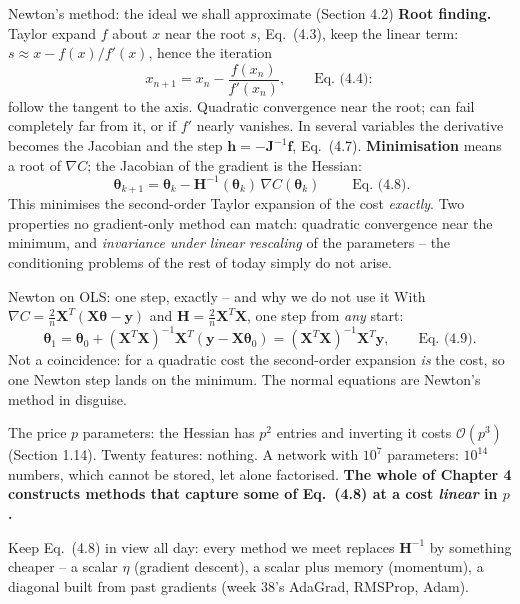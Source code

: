 \documentclass[10pt,aspectratio=169]{beamer}
\begin{document}
\begin{frame}{Newton's method: the ideal we shall approximate (Section 4.2)}
\textbf{Root finding.}  Taylor expand $f$ about $x$ near the root $s$,
Eq.~(4.3), keep the linear term:
$s\approx x-f(x)/f'(x)$, hence the iteration
\[
  x_{n+1}=x_n-\frac{f(x_n)}{f'(x_n)},\qquad\text{Eq.~(4.4)}:
\]
follow the tangent to the axis.  Quadratic convergence near the root; can
fail completely far from it, or if $f'$ nearly vanishes.  In several
variables the derivative becomes the Jacobian and the step
$\bm{h}=-\bm{J}^{-1}\bm{f}$, Eq.~(4.7).
\vspace{3pt}
\textbf{Minimisation} means a root of $\nabla C$; the Jacobian of the gradient
is the Hessian:
\[
  \boxed{\;\bm{\theta}_{k+1}=\bm{\theta}_k-\bm{H}^{-1}(\bm{\theta}_k)\,\nabla C(\bm{\theta}_k)\;}
  \qquad\text{Eq.~(4.8)}.
\]
This minimises the second-order Taylor expansion of the cost \emph{exactly}.
Two properties no gradient-only method can match: quadratic convergence
near the minimum, and \emph{invariance under linear rescaling} of the
parameters -- the conditioning problems of the rest of today simply do not
arise.
\end{frame}

\begin{frame}{Newton on OLS: one step, exactly -- and why we do not use it}
With $\nabla C=\frac{2}{n}\bm{X}^T(\bm{X}\bm{\theta}-\bm{y})$ and
$\bm{H}=\frac{2}{n}\bm{X}^T\bm{X}$, one step from \emph{any} start:
\[
  \bm{\theta}_1=\bm{\theta}_0+(\bm{X}^T\bm{X})^{-1}\bm{X}^T(\bm{y}-\bm{X}\bm{\theta}_0)
  =(\bm{X}^T\bm{X})^{-1}\bm{X}^T\bm{y},\qquad\text{Eq.~(4.9)}.
\]
Not a coincidence: for a quadratic cost the second-order expansion \emph{is}
the cost, so one Newton step lands on the minimum.  The normal equations are
Newton's method in disguise.
\vspace{4pt}
\begin{block}{The price}
$p$ parameters: the Hessian has $p^2$ entries and inverting it costs
$\mathcal{O}(p^3)$ (Section 1.14).  Twenty features: nothing.  A network with
$10^7$ parameters: $10^{14}$ numbers, which cannot be stored, let alone
factorised.  \textbf{The whole of Chapter 4 constructs methods that capture
some of Eq.~(4.8) at a cost \emph{linear} in $p$.}
\end{block}
\vspace{2pt}
Keep Eq.~(4.8) in view all day: every method we meet replaces
$\bm{H}^{-1}$ by something cheaper -- a scalar $\eta$ (gradient descent), a
scalar plus memory (momentum), a diagonal built from past gradients (week
38's AdaGrad, RMSProp, Adam).
\end{frame}
\end{document}
